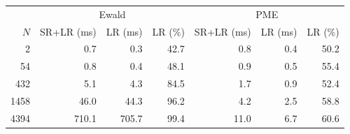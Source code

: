 \begin{tabular}{r | r r r | r r r}
\toprule
  \multicolumn{1}{c}{} & \multicolumn{3}{c}{Ewald} & \multicolumn{3}{c}{PME} \\ 
           $N$  &      SR+LR (ms)  &         LR (ms)  &         LR (\%)  &      SR+LR (ms)  &         LR (ms)  &         LR (\%) \\ 
\midrule
             2  &       \num{0.7}  &       \num{0.3}  &      \num{42.7}  &       \num{0.8}  &       \num{0.4}  &      \num{50.2} \\ 
            54  &       \num{0.8}  &       \num{0.4}  &      \num{48.1}  &       \num{0.9}  &       \num{0.5}  &      \num{55.4} \\ 
           432  &       \num{5.1}  &       \num{4.3}  &      \num{84.5}  &       \num{1.7}  &       \num{0.9}  &      \num{52.4} \\ 
          1458  &      \num{46.0}  &      \num{44.3}  &      \num{96.2}  &       \num{4.2}  &       \num{2.5}  &      \num{58.8} \\ 
          4394  &     \num{710.1}  &     \num{705.7}  &      \num{99.4}  &      \num{11.0}  &       \num{6.7}  &      \num{60.6} \\ 

\end{tabular}
